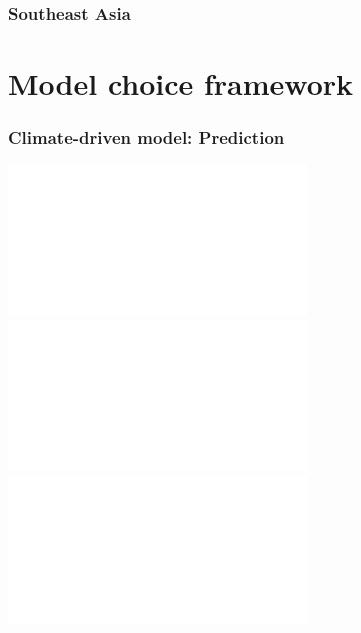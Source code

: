 {
\begin{frame}
    \frametitle{Southeast Asia}    
\end{frame}
}

\section{Model choice framework}
\begin{frame}
    \frametitle{Climate-driven model: Prediction}
    \centerline{
    \includegraphics<1>[width=\textwidth]{../images/sea-level-prediction-bare.pdf}
    \includegraphics<2>[width=\textwidth]{../images/sea-level-prediction-trees.pdf}
    \includegraphics<3>[width=\textwidth]{../images/sea-level-prediction-trees-labels.pdf}
    }
\end{frame}

